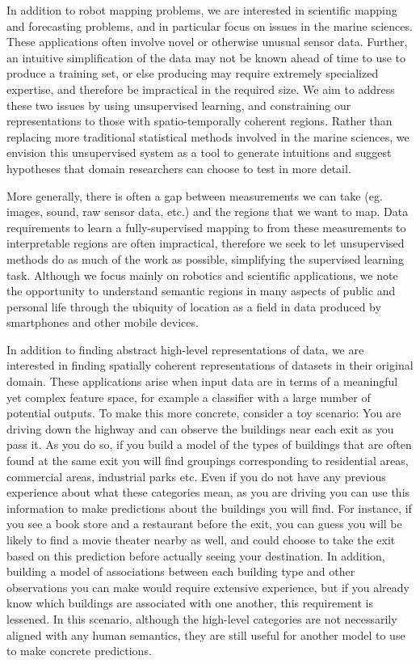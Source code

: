 In addition to robot mapping problems, we are interested in scientific mapping and forecasting problems, and in particular focus on issues in the marine sciences. These applications often involve novel or otherwise unusual sensor data. Further, an intuitive simplification of the data may not be known ahead of time to use to produce a training set, or else producing may require extremely specialized expertise, and therefore be impractical in the required size. We aim to address these two issues by using unsupervised learning, and constraining our representations to those with spatio-temporally coherent regions. Rather than replacing more traditional statistical methods involved in the marine sciences, we envision this unsupervised system as a tool to generate intuitions and suggest hypotheses that domain researchers can choose to test in more detail.

More generally, there is often a gap between measurements we can take (eg. images, sound, raw sensor data, etc.) and the regions that we want to map. Data requirements to learn a fully-supervised mapping to from these measurements to interpretable regions are often impractical, therefore we seek to let unsupervised methods do as much of the work as possible, simplifying the supervised learning task. Although we focus mainly on robotics and scientific applications, we note the opportunity to understand semantic regions in many aspects of public and personal life through the ubiquity of location as a field in data produced by smartphones and other mobile devices.

In addition to finding abstract high-level representations of data, we are interested in finding spatially coherent representations of datasets in their original domain. These applications arise when input data are in terms of a meaningful yet complex feature space, for example a classifier with a large number of potential outputs. To make this more concrete, consider a toy scenario: You are driving down the highway and can observe the buildings near each exit as you pass it. As you do so, if you build a model of the types of buildings that are often found at the same exit you will find groupings corresponding to residential areas, commercial areas, industrial parks etc. Even if you do not have any previous experience about what these categories mean, as you are driving you can use this information to make predictions about the buildings you will find. For instance, if you see a book store and a restaurant before the exit, you can guess you will be likely to find a movie theater nearby as well, and could choose to take the exit based on this prediction before actually seeing your destination.
In addition, building a model of associations between each building type and other observations you can make would require extensive experience, but if you already know which buildings are associated with one another, this requirement is lessened. In this scenario, although the high-level categories are not necessarily aligned with any human semantics, they are still useful for another model to use to make concrete predictions.

